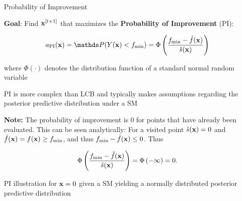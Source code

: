 \documentclass[11pt,compress,t,notes=noshow, xcolor=table]{beamer}
\begin{document}
\begin{vbframe}{Probability of Improvement}

\textbf{Goal}: Find $\mathbf{x}^{[t+1]}$ that maximizes the \textbf{Probability of Improvement} (PI):

$$
  a_{\text{PI}}(\xv) = \P(Y(\xv) < \fmin) = \Phi\left(\frac{\fmin - \fh(\xv)}{\sh(\xv)}\right)
$$

where $\Phi(\cdot)$ denotes the distribution function of a standard normal random variable\\

\vspace{1em}

PI is more complex than LCB and typically makes assumptions regarding the posterior predictive distribution under a SM

\vfill

\begin{footnotesize}
\textbf{Note:} The probability of improvement is $0$ for points that have already been evaluated. This can be seen analytically: For a visited point $\hat{s}(\mathbf{x}) = 0$ and $\hat{f}(\mathbf{x}) = f(\mathbf{x}) \ge f_{\min}$, and thus $f_{\min} - \hat{f}(\mathbf{x}) \le 0$. Thus

$$
  \Phi\left(\frac{f_{\min} - \hat{f}(\mathbf{x})}{\hat{s}(\mathbf{x})}\right) = \Phi\left(- \infty\right) = 0.
$$

\end{footnotesize}

\framebreak

PI illustration for $\mathbf{x} = 0$ given a SM yielding a normally distributed posterior predictive distribution\\

\vspace{0.45em}


\end{vbframe}
\end{document}
